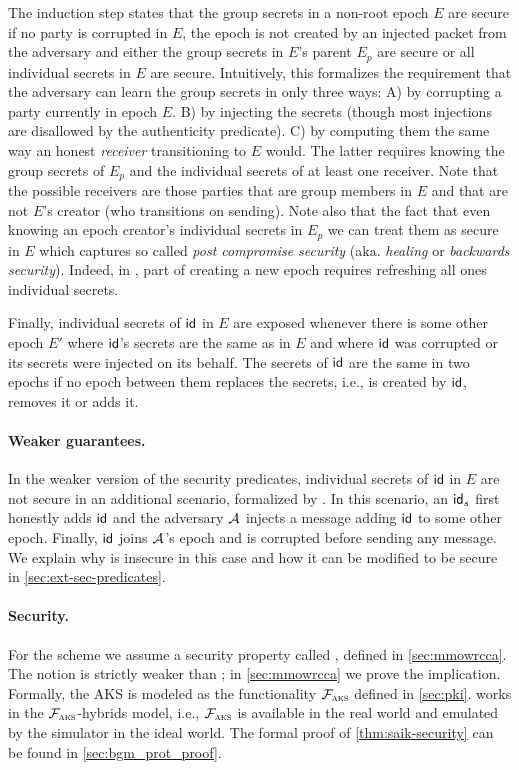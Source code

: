 The induction step states that the group secrets in a non-root epoch $E$
are secure if no party is corrupted in $E$, the epoch is not created
by an injected packet from the adversary and either the group secrets in
$E$'s parent $E_p$ are secure or all individual secrets in
$E$ are secure. Intuitively, this formalizes the requirement that the
adversary can learn the group secrets in only three ways: A) by corrupting a
party currently in epoch $E$. B) by injecting the secrets (though
most injections are disallowed by the authenticity predicate). C) by
computing them the same way an honest \emph{receiver} transitioning to
$E$ would. The latter requires knowing the group secrets of
$E_p$ and the individual secrets of at least one receiver. Note that
the possible receivers are those parties that are group members in
$E$ and that are not $E$'s creator (who transitions on
sending). Note also that the fact that even knowing an epoch creator's individual
secrets in $E_p$ we can treat them as secure in $E$ which captures
so called \emph{post compromise security} (aka. \emph{healing} or
\emph{backwards security}). Indeed, in \saik, part of creating a new epoch
requires refreshing all ones individual secrets.

Finally, individual secrets of ${\mathsf{id}}$ in $E$ are exposed whenever
there is some other epoch $E'$ where ${\mathsf{id}}$'s secrets are the same as
in $E$ and where ${\mathsf{id}}$ was corrupted or its secrets were injected on
its behalf. The secrets of ${\mathsf{id}}$ are the same in two epochs if no epoch between them replaces the secrets, i.e., is created by ${\mathsf{id}}$, removes
it or adds it.

\paragraph{Weaker guarantees.}
In the weaker version of the security predicates, individual secrets of ${\mathsf{id}}$
in $E$ are not secure in an additional scenario, formalized by
\safeWeakAdd. In this scenario, an ${\mathsf{id}}_s$ first honestly adds ${\mathsf{id}}$ and the
adversary $\mathcal{A}_{\relax}$ injects a message adding ${\mathsf{id}}$ to some other epoch. Finally,
${\mathsf{id}}$ joins $\mathcal{A}_{\relax}$'s epoch and is corrupted before sending any message. We explain why \saik is insecure in this case and how it can be modified to be secure in
\cref{sec:ext-sec-predicates}.

\paragraph{Security.} 
For the \mmPKE scheme we assume a security property called \mmowrcca, defined in \cref{sec:mmowrcca}. The notion is strictly weaker than \mmindcca; in \cref{sec:mmowrcca} we prove the implication.
%
Formally, the AKS is modeled as the functionality $\mathcal{F}_{\normalfont\textsc{aks}}$ defined in \cref{sec:pki}. \saik
works in the $\mathcal{F}_{\normalfont\textsc{aks}}$-hybrids model, i.e., $\mathcal{F}_{\normalfont\textsc{aks}}$ is available in the real world and emulated by the simulator in the ideal world.
The formal proof of \cref{thm:saik-security} can be found in \cref{sec:bgm_prot_proof}.

